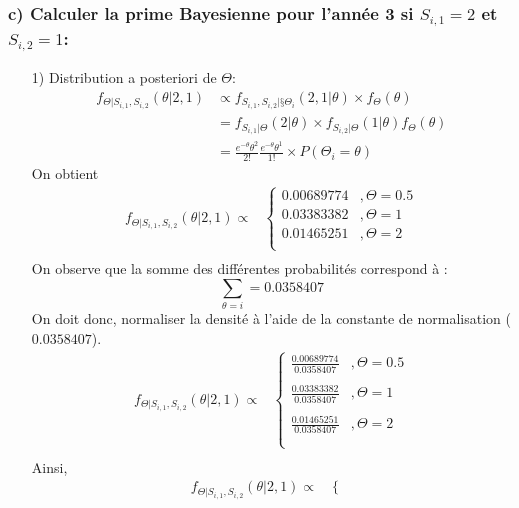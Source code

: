 \documentclass[11pt,french]{report}
\newcommand{\fact}[1]{#1\mathpunct{}!}
\begin{document}
\subsubsection*{c) Calculer la prime Bayesienne pour l'année 3 si $S_{i,1} = 2$  et $S_{i,2} = 1$:}
\begin{itemize}
\item[1)] Distribution a posteriori de $\Theta$:
\begin{align*}
f_{\Theta|S_{i,1},S_{i,2}}(\theta|2,1) &\propto f_{S_{i,1},S_{i,2}|§\Theta_i}(2,1|\theta) \times f_{\Theta}(\theta) \\
&= f_{S_{i,1}|\Theta}(2|\theta) \times f_{S_{i,2}|\Theta}(1|\theta) f_{\Theta}(\theta) \\
&= \frac{e^{-\theta}\theta^2}{\fact{2}}\frac{e^{-\theta}\theta^1}{\fact{1}} \times P(\Theta_i =\theta)
\end{align*}
On obtient
\begin{align*}
f_{\Theta|S_{i,1},S_{i,2}}(\theta|2,1) \propto & \left\{
     \begin{array}{rl}
      0.00689774 &, \Theta = 0.5 \\
      0.03383382 &, \Theta = 1 \\
      0.01465251 &, \Theta = 2 \\
     \end{array}
     \right. \\
\end{align*}
On observe que la somme des différentes probabilités correspond à :
 $$ \sum_{\theta = i} = 0.0358407 $$
On doit donc, normaliser la densité à l'aide de la constante de normalisation ($0.0358407$).
\begin{align*}
f_{\Theta|S_{i,1},S_{i,2}}(\theta|2,1) \propto & \left\{
     \begin{array}{rl}
      \frac{0.00689774 }{0.0358407}  &, \Theta = 0.5 \\ \\
      \frac{0.03383382 }{0.0358407}   &, \Theta = 1 \\ \\
      \frac{0.01465251 }{0.0358407}  &, \Theta = 2 \\ \\
     \end{array}
     \right. \\
\end{align*}
Ainsi,
\begin{align*}
f_{\Theta|S_{i,1},S_{i,2}}(\theta|2,1) \propto & \left\{
     \begin{array}{rl}

\end{array}
\end{align*}
\end{itemize}
\end{document}
